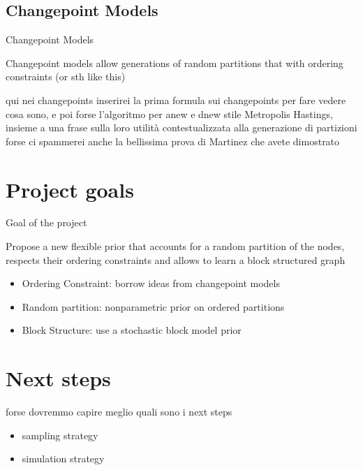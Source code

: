 \subsection{Changepoint Models}
\begin{frame}{Changepoint Models}

Changepoint models allow generations of random partitions that with ordering constraints (or sth like this)

qui nei changepoints inserirei la prima formula sui changepoints 
per fare vedere cosa sono, e poi forse l'algoritmo per anew e dnew stile Metropolis Hastings, insieme a una frase sulla loro utilità contestualizzata alla generazione di partizioni
forse ci spammerei anche la bellissima prova di Martinez che avete dimostrato 


\end{frame}








\section{Project goals}


\begin{frame}[containsverbatim]{Goal of the project}

Propose a \alert {new flexible prior that accounts for a random partition of the nodes}, respects their ordering constraints and allows to learn a block structured graph

 \begin{itemize}
     \item Ordering Constraint: borrow ideas from changepoint models
     \item Random partition: nonparametric prior on ordered partitions
     \item Block Structure: use a stochastic block model prior
 \end{itemize}



\end{frame}

\section{Next steps}
\begin{frame}

forse dovremmo capire meglio quali sono i next steps

\begin{itemize}
    \item sampling strategy
    \item simulation strategy
\end{itemize}



\centering \Huge 
\end{frame}





